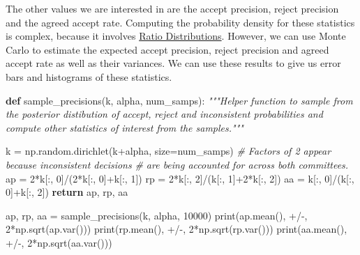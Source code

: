 \documentclass[a4paperpaper,]{article}
\newenvironment{Shaded}{}{}
\newcommand{\BuiltInTok}[1]{#1}
\newcommand{\CommentTok}[1]{\textcolor[rgb]{0.38,0.63,0.69}{\textit{#1}}}
\newcommand{\ControlFlowTok}[1]{\textcolor[rgb]{0.00,0.44,0.13}{\textbf{#1}}}
\newcommand{\DecValTok}[1]{\textcolor[rgb]{0.25,0.63,0.44}{#1}}
\newcommand{\KeywordTok}[1]{\textcolor[rgb]{0.00,0.44,0.13}{\textbf{#1}}}
\newcommand{\NormalTok}[1]{#1}
\newcommand{\OperatorTok}[1]{\textcolor[rgb]{0.40,0.40,0.40}{#1}}
\newcommand{\StringTok}[1]{\textcolor[rgb]{0.25,0.44,0.63}{#1}}
\begin{document}
The other values we are interested in are the accept precision, reject
precision and the agreed accept rate. Computing the probability density
for these statistics is complex, because it involves
\href{http://en.wikipedia.org/wiki/Ratio_distribution}{Ratio
Distributions}. However, we can use Monte Carlo to estimate the expected
accept precision, reject precision and agreed accept rate as well as
their variances. We can use these results to give us error bars and
histograms of these statistics.

\begin{Shaded}
\begin{Highlighting}[]
\KeywordTok{def}\NormalTok{ sample\_precisions(k, alpha, num\_samps):}
    \CommentTok{"""Helper function to sample from the posterior distibution of accept, }
\CommentTok{    reject and inconsistent probabilities and compute other statistics of interest }
\CommentTok{    from the samples."""}

\NormalTok{    k }\OperatorTok{=}\NormalTok{ np.random.dirichlet(k}\OperatorTok{+}\NormalTok{alpha, size}\OperatorTok{=}\NormalTok{num\_samps)}
    \CommentTok{\# Factors of 2 appear because inconsistent decisions }
    \CommentTok{\# are being accounted for across both committees.}
\NormalTok{    ap }\OperatorTok{=} \DecValTok{2}\OperatorTok{*}\NormalTok{k[:, }\DecValTok{0}\NormalTok{]}\OperatorTok{/}\NormalTok{(}\DecValTok{2}\OperatorTok{*}\NormalTok{k[:, }\DecValTok{0}\NormalTok{]}\OperatorTok{+}\NormalTok{k[:, }\DecValTok{1}\NormalTok{])}
\NormalTok{    rp }\OperatorTok{=} \DecValTok{2}\OperatorTok{*}\NormalTok{k[:, }\DecValTok{2}\NormalTok{]}\OperatorTok{/}\NormalTok{(k[:, }\DecValTok{1}\NormalTok{]}\OperatorTok{+}\DecValTok{2}\OperatorTok{*}\NormalTok{k[:, }\DecValTok{2}\NormalTok{])}
\NormalTok{    aa }\OperatorTok{=}\NormalTok{ k[:, }\DecValTok{0}\NormalTok{]}\OperatorTok{/}\NormalTok{(k[:, }\DecValTok{0}\NormalTok{]}\OperatorTok{+}\NormalTok{k[:, }\DecValTok{2}\NormalTok{])}
    \ControlFlowTok{return}\NormalTok{ ap, rp, aa}

\NormalTok{ap, rp, aa }\OperatorTok{=}\NormalTok{ sample\_precisions(k, alpha, }\DecValTok{10000}\NormalTok{)}
\BuiltInTok{print}\NormalTok{(ap.mean(), }\StringTok{\textquotesingle{}+/{-}\textquotesingle{}}\NormalTok{, }\DecValTok{2}\OperatorTok{*}\NormalTok{np.sqrt(ap.var()))}
\BuiltInTok{print}\NormalTok{(rp.mean(), }\StringTok{\textquotesingle{}+/{-}\textquotesingle{}}\NormalTok{, }\DecValTok{2}\OperatorTok{*}\NormalTok{np.sqrt(rp.var()))}
\BuiltInTok{print}\NormalTok{(aa.mean(), }\StringTok{\textquotesingle{}+/{-}\textquotesingle{}}\NormalTok{, }\DecValTok{2}\OperatorTok{*}\NormalTok{np.sqrt(aa.var()))}
\end{Highlighting}
\end{Shaded}
\end{document}
